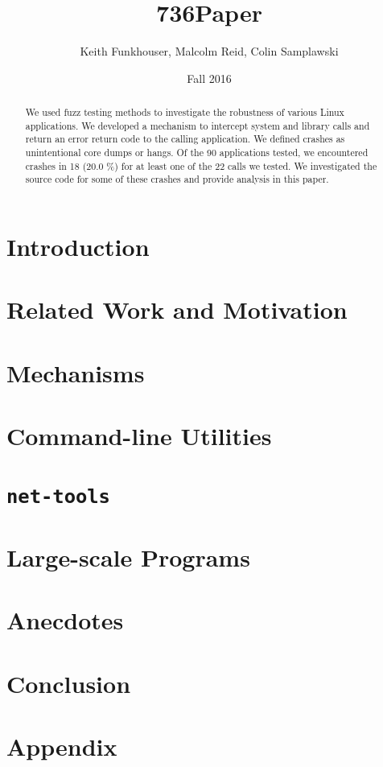 \documentclass[10pt]{article}
\title{736Paper}
\author{Keith Funkhouser, Malcolm Reid, Colin Samplawski}
\date{Fall 2016}
\begin{document}
\setlength{\baselineskip}{18pt}
\maketitle

\begin{abstract}
We used fuzz testing methods to investigate the robustness of various Linux applications. We developed a mechanism to intercept system and library calls and return an error return code to the calling application. We defined crashes as unintentional core dumps or hangs. Of the 90 applications tested, we encountered crashes in 18 (20.0 \%) for at least one of the 22 calls we tested. We investigated the source code for some of these crashes and provide analysis in this paper. 
\end{abstract}

\section{Introduction}


\section{Related Work and Motivation}



\section{Mechanisms}




\section{Command-line Utilities}


\section{\texttt{net-tools}}


\section{Large-scale Programs}


\section{Anecdotes}


\section{Conclusion}




\newpage
\appendix
\section*{Appendix}



\end{document}
